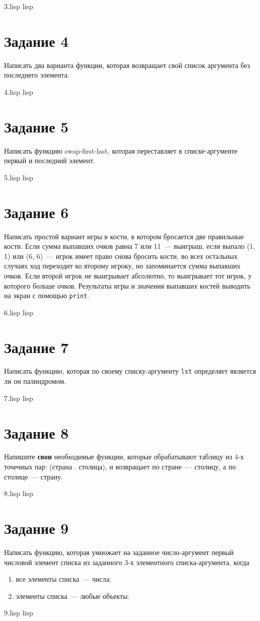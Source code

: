 {3.lisp}
{lisp}
{}

\section{Задание 4}
Написать два варианта функции, которая возвращает свой список аргумента без последнего элемента.

{4.lisp}
{lisp}
{}

\section{Задание 5}
Написать функцию swap-first-last, которая переставляет в списке-аргументе первый и последний элемент.

{5.lisp}
{lisp}
{}

\section{Задание 6}
Написать простой вариант игры в кости, в котором бросается две правильные кости. Если сумма выпавших очков равна 7 или 11~--- выигрыш, если выпало (1, 1) или (6, 6)~--- игрок имеет право снова бросить кости, во всех остальных случаях ход переходит ко второму игроку, но запоминается сумма выпавших очков. Если второй игрок не выигрывает абсолютно, то выигрывает тот игрок, у которого больше очков. Результаты игры и значения выпавших костей выводить на экран с помощью \texttt{print}.

{6.lisp}
{lisp}
{}

\section{Задание 7}
Написать функцию, которая по своему списку-аргументу \texttt{lst} определяет является ли он палиндромом.

{7.lisp}
{lisp}
{}

\section{Задание 8}
Напишите \textbf{свои} необходимые функции, которые обрабатывают таблицу из 4-х точечных пар: (страна . столица), и возвращает по стране~--- столицу, а по столице~--- страну.

{8.lisp}
{lisp}
{}

\section{Задание 9}
Написать функцию, которая умножает на заданное число-аргумент первый числовой элемент списка из заданного 3-х элементного списка-аргумента, когда
\begin{enumerate}
	\item все элементы списка~--- числа;
	\item элементы списка~--- любые объекты.
\end{enumerate}

{9.lisp}
{lisp}
{}
